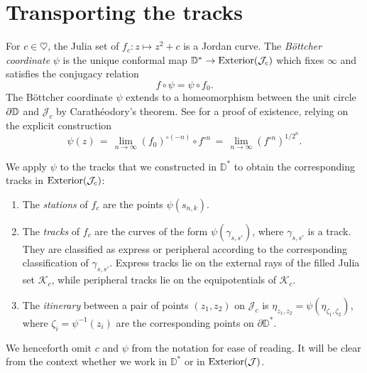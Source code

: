 \section{Transporting the tracks} \label{rails-section}
For $c \in \heartsuit$, the Julia set of $f_c: z\mapsto z^2+c$ is a Jordan curve. The {\em Böttcher coordinate} $\psi$ is the unique conformal map $\mathbb{D}^{*}\to\operatorname{Exterior}(\mathcal{J}_c)$  which fixes $\infty$ and satisfies the conjugacy relation 
$$
f\circ\psi=\psi\circ f_{0}.
$$
The Böttcher coordinate $\psi$ extends to a homeomorphism between the unit circle $\partial\mathbb{D}$ and $\mathcal{J}_c$ by Carathéodory's
theorem. See \cite[Theorem 9.5]{milnor_book} for a proof of existence, 
relying on the explicit construction 
\begin{equation}
	\psi(z) \, = \, \lim_{n\to \infty} (f_0)^{\circ (-n)} \circ f^{\circ n}\, = \, \lim_{n\to \infty} {(f^{\circ n})}^{1/2^n}.	
\end{equation}



We apply $\psi$ to the tracks that we constructed in $\mathbb D^*$ 
to obtain the corresponding tracks in $\operatorname{Exterior}(\mathcal{J}_c)$:
\begin{definition} \leavevmode
\begin{enumerate}
	\item The 	\emph{stations} of $f_c$ are the points $\psi(s_{n,k})$.


\item The \emph{tracks} of $f_c$ are the curves of the form $\psi \left(\gamma_{s,s'}\right)$, where $\gamma_{s,s'}$ is a track. They are classified as express or peripheral according to the corresponding classification of $\gamma_{s,s'}$. 
Express tracks lie on the external rays of the filled Julia set $\mathcal K_c$, while peripheral tracks lie on the equipotentials of $\mathcal K_c$.

\item The \emph{itinerary} between a pair of points $(z_1,z_2)$ on $\mathcal J_c$ is
$\eta_{z_1,z_2}=\psi(\eta_{\zeta_1,\zeta_2})$, 
where $\zeta_i=\psi^{-1}(z_i)$ are the corresponding points on $\partial \mathbb D^*$. 
\end{enumerate}

We henceforth omit $c$ and $\psi$ from the notation for ease of reading. It will be clear from the context whether we work in $\mathbb D^*$ or in $\operatorname{Exterior}(\mathcal J)$.

\end{definition}

